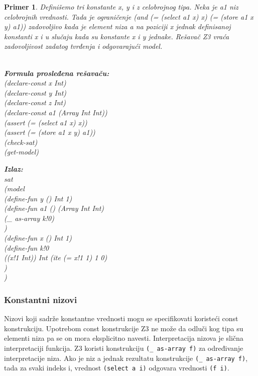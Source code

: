 \documentclass[12pt,oneside]{memoir}
\newcommand\tab[1][0.5cm]{\hspace*{#1}}
\newtheorem{primer}{Primer}
\begin{document}
\begin{primer} Definišemo tri konstante x, y i z celobrojnog tipa. Neka je a1 niz celobrojnih vrednosti. Tada je ograničenje (and (= (select a1 x) x) (= (store a1 x y) a1)) zadovoljivo kada je element niza a na poziciji x jednak definisanoj konstanti x i u slučaju kada su konstante x i y jednake.
Rešavač Z3 vraća zadovoljivost zadatog tvrđenja i odgovarajući model.
 \\ \\
\begin{minipage}[b]{0.45\textwidth}
\textbf{Formula prosleđena rešavaču:}
\\(declare-const x Int)
\\(declare-const y Int)
\\(declare-const z Int)
\\(declare-const a1 (Array Int Int))
\\(assert (= (select a1 x) x))
\\(assert (= (store a1 x y) a1))
\\(check-sat)
\\(get-model)
\end{minipage}
\hspace{1.3cm} 
\begin{minipage}[t]{0.5\textwidth}
\vspace{-5.3cm}
\textbf{Izlaz:}
\\sat
\\(model 
\\\tab(define-fun y () Int 1)
\\\tab(define-fun a1 () (Array Int Int)
\\\tab\tab(\_ as-array k!0)
\\\tab)
\\\tab(define-fun x () Int 1)
\\\tab(define-fun k!0 
\\\tab\tab((x!1 Int)) Int (ite (= x!1 1) 1 0)
\\\tab)
\\)

\end{minipage}
\end{primer} 
 

\subsubsection{Konstantni nizovi}

Nizovi koji sadrže konstantne vrednosti mogu se specifikovati koristeći const konstrukciju. Upotrebom const konstrukcije Z3 ne može da odluči kog tipa su elementi niza pa se on mora eksplicitno navesti. Interpretacija nizova je slična interpretaciji funkcija. Z3 koristi konstrukciju \texttt{(\_ as-array f)} za određivanje interpretacije niza. Ako je niz a jednak rezultatu konstrukcije \texttt{(\_ as-array f)}, tada za svaki indeks i, vrednost \texttt{(select a i)} odgovara vrednosti \texttt{(f i)}. 
\end{document}
